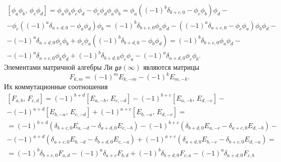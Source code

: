 \documentclass[a5paper,twoside]{extarticle}
\begin{document}
\begin{multline*}
\left[ \phi_{a}\phi_b,\,\phi_{c}\phi_d \right] =
\phi_a \phi_b \phi_c \phi_d -\phi_c \phi_d \phi_a \phi_b=
\phi_a \left( \left( -1 \right) ^b \delta_{b+c,0}-\phi_c \phi_b
 \right) 	\phi_d-\\-
 \phi_c \left( \left( -1 \right) ^a \delta_{a+d,0}-\phi_a \phi_d \right) \phi_b=
\left( -1 \right) ^b \delta_{b+c,0} \phi_a \phi_d-
(\left( -1 \right)^a \delta_{a+c,0}- \phi_c \phi_a) \phi_b \phi_d-\\-\left( -1 \right) ^a
\delta_{a+d,0} \phi_c \phi_b+\phi_c \phi_a \left(\left( -1 \right) ^b \delta_{b+d,0}-\phi_b \phi_d
\right) =\left( -1 \right) ^b \delta_{b+c,0} \phi_a \phi_d-\\-
\left( -1 \right)^a \delta_{a+c,0} \phi_b \phi_d+ \left( -1 \right) ^b \delta_{b+d,0} \phi_c \phi_a-\left( -1 \right) ^a
\delta_{a+d,0} \phi_c \phi_b
.\end{multline*} 
Элементами матричной алгебры Ли $\mathfrak{go}(\infty)$
являются матрицы
\[
	F_{k,m}=(-1)^m E_{k,-m}-(-1)^k E_{m,-k}
.\] 
Их коммутационные соотношения
\begin{multline*}
	\left[ F_{a,b},\,F_{c,d} \right] =(-1)^{b+d}\left[ E_{a,-b},\, E_{c,-d} \right] -(-1)^{b+c} \left[ 
	E_{a,-b},\,E_{d,-c}\right] -\\-\left( -1 \right) ^{
a+d}\left[ E_{b,-a},\,E_{c,-d} \right] +
\left( -1 \right) ^{a+c}\left[ E_{b,-a},\,E_{d,-c} \right] =
\\=(-1)^{b+d}\left( \delta_{b+c,0} E_{a,-d}-
\delta_{a+d,0} E_{c,-b}\right) -
\left( -1 \right) ^{b+c}\left( \delta_{b+d,0}E_{a,-c}-
\delta_{a+c,0}E_{d,-b}\right)-\\-
\left( -1 \right) ^{a+d} \left( \delta_{a+c,0} E_{b,-d}
-\delta_{b+d,0}E_{c,-a}\right) +\left( -1 \right) ^{a+c}
\left( \delta_{a+d,0} E_{b,-c} -\delta_{b+c,0} E_{d,-a} \right) =\\=
(-1)^b \delta_{b+c,0} F_{a,d}-(-1)^a \delta_{a+c}F_{b,d}+
\left( -1 \right) ^b\delta_{b+d,0} F_{c,a}-\left( -1 \right) ^a \delta_{a+d,0} F_{c,b}
\end{multline*} 
\end{document}
